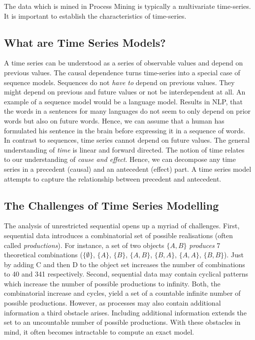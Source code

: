 \documentclass[./../../paper.tex]{subfiles}
\begin{document}
The data which is mined in Process Mining is typically a multivariate time-series. It is important to establish the characteristics of time-series.

\subsection{What are Time Series Models?}
A time series can be understood as a series of observable values and depend on previous values. The causal dependence turns time-series into a special case of sequence models. Sequences do not \emph{have to} depend on previous values. They might depend on previous and future values or not be interdependent at all. An example of a sequence model would be a language model. Results in \gls{NLP}, that the words in a sentences for many languages do not seem to only depend on prior words but also on future words\needscite{}. Hence, we can assume that a human has formulated his sentence in the brain before expressing it in a sequence of words\needscite{}. In contrast to sequences, time series cannot depend on future values. The general understanding of \emph{time} is linear and forward directed\needscite{}. The notion of time relates to our understanding of \emph{cause and effect}. Hence, we can decompose any time series in a precedent (causal) and an antecedent (effect) part. A time series model attempts to capture the relationship between precedent and antecedent.

\subsection{The Challenges of Time Series Modelling}
The analysis of unrestricted sequential opens up a myriad of challenges. First, sequential data introduces a combinatorial set of possible realisations (often called \emph{productions}). For instance, a set of two objects $\{A,B\}$ \emph{produces} 7 theoretical combinations ($\{\emptyset\}$, $\{A\}$, $\{B\}$, $\{A,B\}$, $\{B,A\}$, $\{A,A\}$, $\{B,B\}$). Just by adding C and then D to the object set increases the number of combinations to 40 and 341 respectively. %
Second, sequential data may contain cyclical patterns which increase the number of possible productions to infinity\needscite{}. Both, the combinatorial increase and cycles, yield a set of a countable infinite number of possible productions. However, as processes may also contain additional information a third obstacle arises. Including additional information extends the set to an uncountable number of possible productions. With these obstacles in mind, it often becomes intractable to compute an exact model.
\end{document}
